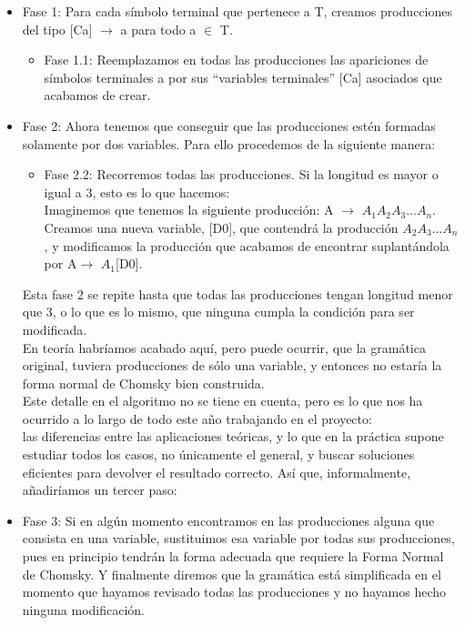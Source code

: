 \documentclass[12pt,a4paper,spanish]{book}
\begin{document}
\begin{itemize}
\item Fase 1: Para cada s\'imbolo terminal que pertenece a T, creamos producciones del tipo [Ca] $\rightarrow$ a
para todo a $\in$ T.
\begin{itemize}
\item Fase 1.1: Reemplazamos en todas las producciones las apariciones de s\'imbolos terminales  a por sus ``variables terminales'' [Ca] asociados que acabamos de crear.
\end{itemize}
\item Fase 2: Ahora tenemos que conseguir que las producciones est\'en formadas solamente por dos variables. Para ello procedemos de la siguiente manera:
\begin{itemize}
\item Fase 2.2: Recorremos todas las producciones. Si la longitud es mayor o igual a 3, esto es lo que hacemos:\\
Imaginemos que tenemos la siguiente producci\'on: A $\rightarrow$ $A_{1}A_{2}A_{3} \ldots A_{n}$. Creamos una nueva variable, [D0], que contendr\'a la producci\'on $A_{2}A_{3} \ldots A_{n}$, y modificamos la producci\'on que acabamos de encontrar suplant\'andola por A$\rightarrow$ $A_{1}$[D0].
\end{itemize}
	Esta fase 2 se repite hasta que todas las producciones tengan longitud menor que 3, o lo que es lo mismo, que ninguna cumpla la condici\'on para ser modificada.\\
\newline
En teor\'ia habr\'iamos acabado aqu\'i, pero puede ocurrir, que la gram\'atica original, tuviera producciones de s\'olo una variable, y entonces no estar\'ia la forma normal de Chomsky bien construida.\\ Este detalle en el algoritmo no se tiene en cuenta, pero es lo que nos ha ocurrido a lo largo de todo este a\~no trabajando en el proyecto:\\ las diferencias entre las aplicaciones te\'oricas, y lo que en la pr\'actica supone estudiar todos los casos, no \'unicamente el general, y buscar soluciones eficientes para devolver el resultado correcto. As\'i que, informalmente, a\~nadir\'iamos un tercer paso:
\item Fase 3: Si en alg\'un momento encontramos en las producciones alguna que consista en una variable, sustituimos esa variable por todas sus producciones, pues en principio tendr\'an la forma adecuada que requiere la Forma Normal de Chomsky. Y finalmente diremos que la gram\'atica est\'a simplificada en el momento que hayamos revisado todas las producciones y no hayamos hecho ninguna modificaci\'on.
\end{itemize}
\end{document}
